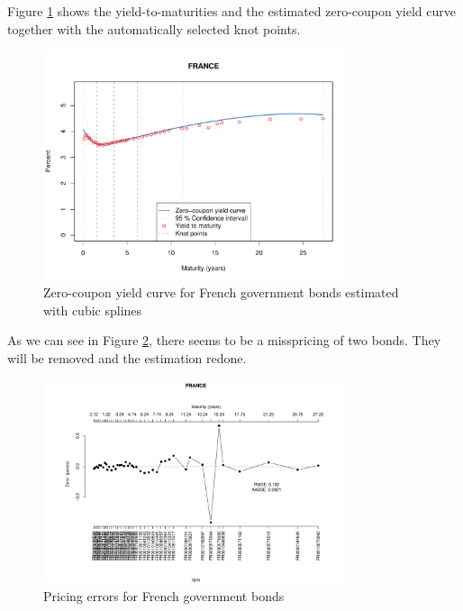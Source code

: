 
Figure \ref{fig:frenchspotcurve} shows the yield-to-maturities and the estimated zero-coupon yield curve together with the automatically selected knot points.

\begin{figure}[htb]
\centering
\caption{Zero-coupon yield curve for French government bonds estimated with cubic splines}
\label{fig:frenchspotcurve}
\includegraphics[width=0.8\textwidth]{fig_frenchspotcurve}
\end{figure}



As we can see in Figure \ref{fig:pricingerrors}, there seems to be a misspricing of two bonds. They will be removed and the estimation redone.

\begin{figure}[htb]
\centering  
\caption{Pricing errors for French government bonds} 
\label{fig:pricingerrors}
\includegraphics[width=0.8\textwidth]{fig_pricingerrors}
\end{figure}

